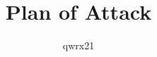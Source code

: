\documentclass{article}
\title{Plan of Attack}
\author{qwrx21}
\begin{document}
\maketitle
\pagebreak

\section{}


\section{}

\end{document}
